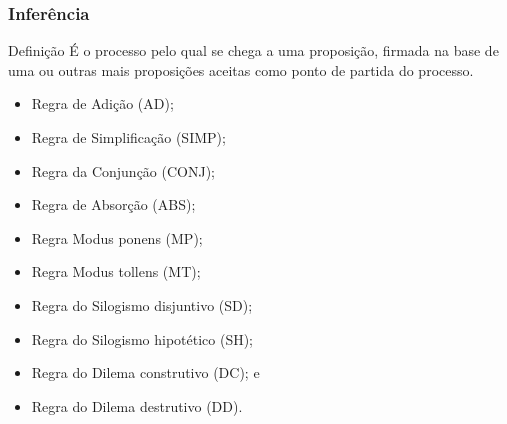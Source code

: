 \documentclass{beamer}
\begin{document}
\begin{frame}
\frametitle{Inferência}

\begin{block}{Definição}
É o processo pelo qual se chega a uma proposição, firmada na base de uma ou outras mais proposições aceitas como ponto de partida do processo.
\end{block}\vfill

\begin{itemize}
	\item Regra de Adição (AD);
	\item Regra de Simplificação (SIMP);
	\item Regra da Conjunção (CONJ);
	\item Regra de Absorção (ABS);
	\item Regra Modus ponens (MP);
	\item Regra Modus tollens (MT);
	\item Regra do Silogismo disjuntivo (SD);
	\item Regra do Silogismo hipotético (SH);
	\item Regra do Dilema construtivo (DC); e
	\item Regra do Dilema destrutivo (DD).
\end{itemize}
\end{frame}
\end{document}
